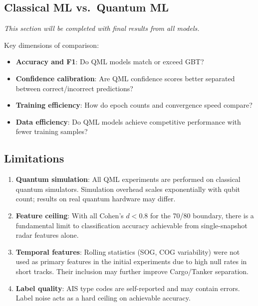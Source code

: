 \documentclass[12pt, a4paper]{article}
\begin{document}
\subsection{Classical ML vs.\ Quantum ML}

\textit{This section will be completed with final results from all models.}

Key dimensions of comparison:
\begin{itemize}
    \item \textbf{Accuracy and F1}: Do QML models match or exceed GBT?
    \item \textbf{Confidence calibration}: Are QML confidence scores better
          separated between correct/incorrect predictions?
    \item \textbf{Training efficiency}: How do epoch counts and convergence
          speed compare?
    \item \textbf{Data efficiency}: Do QML models achieve competitive
          performance with fewer training samples?
\end{itemize}

\subsection{Limitations}

\begin{enumerate}
    \item \textbf{Quantum simulation}: All QML experiments are performed on
          classical quantum simulators. Simulation overhead scales exponentially
          with qubit count; results on real quantum hardware may differ.
    \item \textbf{Feature ceiling}: With all Cohen's $d < 0.8$ for the 70/80
          boundary, there is a fundamental limit to classification accuracy
          achievable from single-snapshot radar features alone.
    \item \textbf{Temporal features}: Rolling statistics (SOG, COG variability)
          were not used as primary features in the initial experiments due to
          high null rates in short tracks. Their inclusion may further improve
          Cargo/Tanker separation.
    \item \textbf{Label quality}: AIS type codes are self-reported and may
          contain errors. Label noise acts as a hard ceiling on achievable accuracy.
\end{enumerate}

\end{document}
